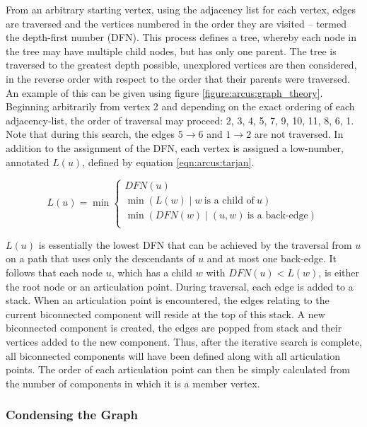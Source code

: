 From an arbitrary starting vertex, using the adjacency list for each vertex, edges are traversed and the vertices numbered in the order they are visited -- termed the depth-first number (DFN). This process defines a tree, whereby each node in the tree may have multiple child nodes, but has only one parent. The tree is traversed to the greatest depth possible,  unexplored vertices are then considered, in the reverse order with respect to the order that their parents were traversed. An example of this can be given using figure \ref{figure:arcus:graph_theory}. Beginning arbitrarily from vertex 2 and depending on the exact ordering of each adjacency-list, the order of traversal may proceed: 2, 3, 4, 5, 7, 9, 10, 11, 8, 6, 1.
Note that during this search, the edges $5 \rightarrow6 $ and $1 \rightarrow2 $ are not traversed. In addition to the assignment of the DFN, each vertex is assigned a low-number, annotated $L(u)$, defined by equation \ref{eqn:arcus:tarjan}. 

\begin{equation}
L(u) =  \min \left\{ \begin{array}{ll}
 DFN(u) \\
\min (L(w) \mid w\ \text{is a child of}\ u)\\ \min(DFN(w)\mid (u,w)\ \text{is a back-edge}) \\
\end{array}
\right.
\label{eqn:arcus:tarjan}
\end{equation}


$L(u)$ is essentially the lowest DFN that can be achieved by the traversal from $u$ on a path that uses only the descendants of $u$ and at most one back-edge. It follows that each node $u$, which has a child $w$ with $DFN(u) < L(w)$, is either the root node or an articulation point. During traversal, each edge is added to a stack. When an articulation point is encountered, the edges relating to the current biconnected component will reside at the top of this stack. A new biconnected component is created, the edges are popped from stack and their vertices added to the new component. Thus, after the iterative search is complete, all biconnected components will have been defined along with all articulation points.
The order of each articulation point can then be simply calculated from the number of components in which it is a member vertex.

\subsubsection{Condensing the Graph}

